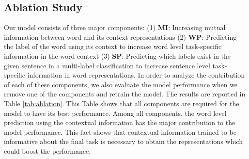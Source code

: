 \documentclass[11pt,a4paper]{article}
\begin{document}
\begin{table}
  \centering
    \caption{Performance of the model and baselines on the Test sets.}
    \label{tab:results}
\end{table}




\subsection{Ablation Study}
Our model consists of three major components: (1) \textbf{MI}: Increasing mutual information between word and its context representations (2) \textbf{WP}: Predicting the label of the word using its context to increase word level task-specific information in the word context (3) \textbf{SP}: Predicting which labels exist in the given sentence in a multi-label classification to increase sentence level task-specific information in word representations. In order to analyze the contribution of each of these components, we also evaluate the model performance when we remove one of the components and retrain the model. The results are reported in Table \ref{tab:ablation}. This Table shows that all components are required for the model to have its best performance. Among all components, the word level prediction using the contextual information has the major contribution to the model performance. This fact shows that contextual information trained to be informative about the final task is necessary to obtain the representations which could boost the performance.
\end{document}
